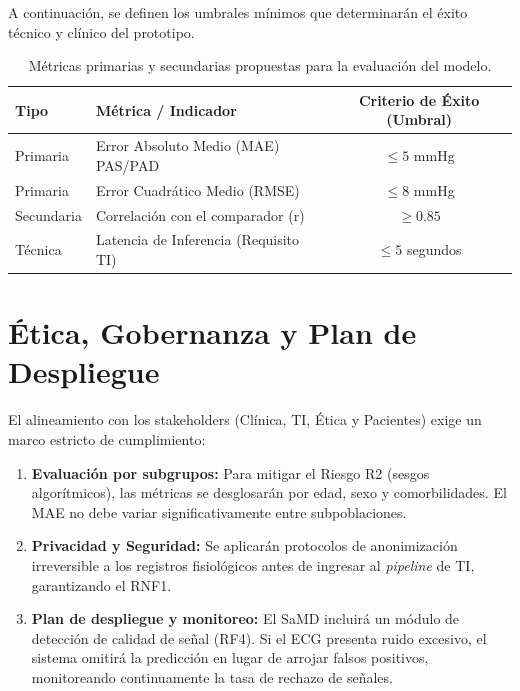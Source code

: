 \documentclass[11pt, a4paper]{article}
\begin{document}
A continuación, se definen los umbrales mínimos que determinarán el éxito técnico y clínico del prototipo.

\begin{table}[htbp]
    \centering
    \caption{Métricas primarias y secundarias propuestas para la evaluación del modelo.}
    \vspace{0.5em}
    \begin{tabular}{llc}
        \toprule
        \textbf{Tipo} & \textbf{Métrica / Indicador} & \textbf{Criterio de Éxito (Umbral)} \\
        \midrule
        Primaria & Error Absoluto Medio (MAE) PAS/PAD & $\le 5$ \unit{\mmHg} \\
        Primaria & Error Cuadrático Medio (RMSE) & $\le 8$ \unit{\mmHg} \\
        Secundaria & Correlación con el comparador (r) & $\ge 0.85$ \\
        Técnica & Latencia de Inferencia (Requisito TI) & $\le 5$ segundos \\
        \bottomrule
    \end{tabular}
    \label{tab:metrics}
\end{table}

\section{Ética, Gobernanza y Plan de Despliegue}
El alineamiento con los stakeholders (Clínica, TI, Ética y Pacientes) exige un marco estricto de cumplimiento:

\begin{enumerate}
    \item \textbf{Evaluación por subgrupos:} Para mitigar el Riesgo R2 (sesgos algorítmicos), las métricas se desglosarán por edad, sexo y comorbilidades. El MAE no debe variar significativamente entre subpoblaciones.
    \item \textbf{Privacidad y Seguridad:} Se aplicarán protocolos de anonimización irreversible a los registros fisiológicos antes de ingresar al \textit{pipeline} de TI, garantizando el RNF1.
    \item \textbf{Plan de despliegue y monitoreo:} El SaMD incluirá un módulo de detección de calidad de señal (RF4). Si el ECG presenta ruido excesivo, el sistema omitirá la predicción en lugar de arrojar falsos positivos, monitoreando continuamente la tasa de rechazo de señales.
\end{enumerate}
\end{document}
